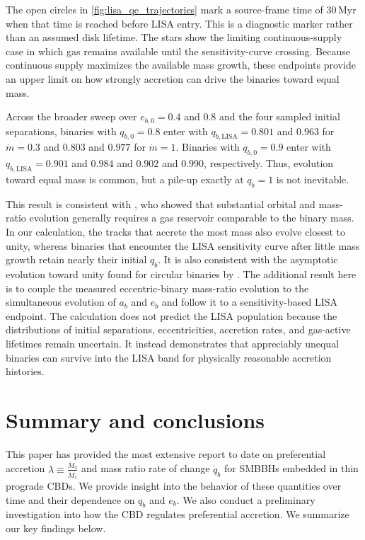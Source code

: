 \documentclass[fleqn,usenatbib]{mnras}
\begin{document}
The open circles in \autoref{fig:lisa_qe_trajectories} mark a source-frame time of $30\,\mathrm{Myr}$ when that time is reached before LISA entry. This is a diagnostic marker rather than an assumed disk lifetime. The stars show the limiting continuous-supply case in which gas remains available until the sensitivity-curve crossing. Because continuous supply maximizes the available mass growth, these endpoints provide an upper limit on how strongly accretion can drive the binaries toward equal mass.

Across the broader sweep over $e_{b,0}=0.4$ and $0.8$ and the four sampled initial separations, binaries with $q_{b,0}=0.8$ enter with $q_{b,\mathrm{LISA}}=0.801$ and $0.963$ for $\dot m=0.3$ and $0.803$ and $0.977$ for $\dot m=1$. Binaries with $q_{b,0}=0.9$ enter with $q_{b,\mathrm{LISA}}=0.901$ and $0.984$ and $0.902$ and $0.990$, respectively. Thus, evolution toward equal mass is common, but a pile-up exactly at $q_b=1$ is not inevitable.

This result is consistent with \citet{valli2024}, who showed that substantial orbital and mass-ratio evolution generally requires a gas reservoir comparable to the binary mass. In our calculation, the tracks that accrete the most mass also evolve closest to unity, whereas binaries that encounter the LISA sensitivity curve after little mass growth retain nearly their initial $q_b$. It is also consistent with the asymptotic evolution toward unity found for circular binaries by \citet{xu2026}. The additional result here is to couple the measured eccentric-binary mass-ratio evolution to the simultaneous evolution of $a_b$ and $e_b$ and follow it to a sensitivity-based LISA endpoint. The calculation does not predict the LISA population because the distributions of initial separations, eccentricities, accretion rates, and gas-active lifetimes remain uncertain. It instead demonstrates that appreciably unequal binaries can survive into the LISA band for physically reasonable accretion histories.


\section{Summary and conclusions}\label{sec:conclusion}
This paper has provided the most extensive report to date on preferential accretion $\lambda \equiv \frac{\dot{M}_2}{\dot{M}_1}$ and mass ratio rate of change $\dot{q}_b$ for SMBBHs embedded in thin prograde CBDs. We provide insight into the behavior of these quantities over time and their dependence on $q_b$ and $e_b$. We also conduct a preliminary investigation into how the CBD regulates preferential accretion. We summarize our key findings below.
\end{document}
